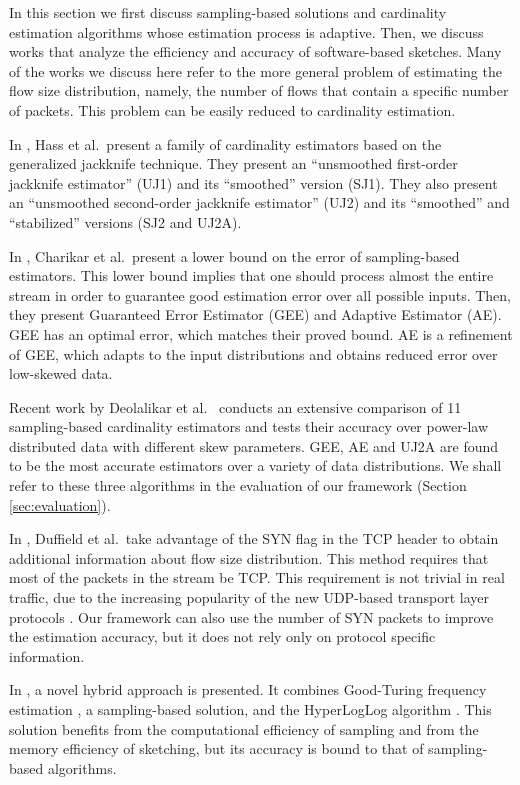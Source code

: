 	In this section we first discuss sampling-based solutions and cardinality estimation algorithms whose estimation process is adaptive. Then, we discuss works that analyze the efficiency and accuracy of software-based sketches. Many of the works we discuss here refer to the more general problem of estimating the flow size distribution, namely, the number of flows that contain a specific number of packets. This problem can be easily reduced to cardinality estimation.
	
	In \cite{haas1998estimating}, Hass et al.\ present a family of cardinality estimators based on the generalized jackknife technique. They present an ``unsmoothed first-order jackknife estimator'' (UJ1) and its ``smoothed'' version (SJ1). They also present an ``unsmoothed second-order jackknife estimator'' (UJ2) and its ``smoothed'' and ``stabilized'' versions (SJ2 and UJ2A). 
	
	In \cite{charikar2000towards}, Charikar et al.\ present a lower bound on the error of sampling-based estimators. This lower bound implies that one should process almost the entire stream in order to guarantee good estimation error over all possible inputs. Then, they present Guaranteed Error Estimator (GEE) and Adaptive Estimator (AE). GEE has an optimal error, which matches their proved bound. AE is a refinement of GEE, which adapts to the input distributions and obtains reduced error over low-skewed data.
	
	Recent work by Deolalikar et al.\ \cite{deolalikar2016extensive} conducts an extensive comparison of 11 sampling-based cardinality estimators and tests their accuracy over power-law distributed data with different skew parameters. GEE, AE and UJ2A \cite{haas1998estimating} are found to be the most accurate estimators over a variety of data distributions. We shall refer to these three algorithms in the evaluation of our framework (Section \ref{sec:evaluation}).
	
	In \cite{duffield2003estimating}, Duffield et al.\ take advantage of the SYN flag in the TCP header to obtain additional information about flow size distribution. This method requires that most of the packets in the stream be TCP. This requirement is not trivial in real traffic, due to the increasing popularity of the new UDP-based transport layer protocols \cite{hamilton2016quic}. Our framework can also use the number of SYN packets to improve the estimation accuracy, but it does not rely only on protocol specific information. 
	
	In \cite{cohen2017cardinality}, a novel hybrid approach is presented. It combines Good-Turing frequency estimation \cite{gale1995good}, a sampling-based solution, and the HyperLogLog algorithm \cite{flajolet2007hyperloglog}. This solution benefits from the computational efficiency of sampling and from the memory efficiency of sketching, but its accuracy is bound to that of sampling-based algorithms.
	
